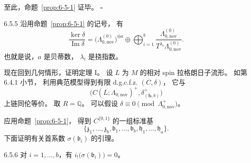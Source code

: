 至此，命题~\ref{prop:6-5-1} 证毕。
\hfill$\square$

\begin{remark}{6.5.5}\label{rem:6-5-5}
沿用命题~\ref{prop:6-5-1} 的记号，
有
\[
\frac{\ker\delta}{\operatorname{Im}\delta}
=\bigl(\Lambda_{0,\mathrm{nov}}^{(0)}\bigr)^{\oplus a}
\oplus
\bigoplus_{i=1}^{b}
\frac{\Lambda_{0,\mathrm{nov}}^{(0)}}
{T^{\lambda_i}\Lambda_{0,\mathrm{nov}}^{(0)}}.
\]
也就是说，$a$ 是贝蒂数，
$\lambda_i$ 是挠指数。
\end{remark}

现在回到几何情形，证明定理 I。
设 $L$ 为 $M$ 的相对 spin
拉格朗日子流形。
如第 6.4.1 小节，
利用典范模型得到有限 d.g.c.f.z.
$(C,\delta)$，
它与
\[
\bigl(C(L;\Lambda_{0,\mathrm{nov}})^+,
\delta^+_{(\boldsymbol b,b)}\bigr)
\]
上链同伦等价。
取 $R=\mathbb Q$。
可以假设
$\delta\equiv0
\pmod{\Lambda_{0,\mathrm{nov}}^+}$。

应用命题~\ref{prop:6-5-1}，
得到 $C^{\{0,1\}}$ 的一组标准基
\[
\{\mathfrak z_1,\ldots,\mathfrak z_b,
\mathfrak b_1,\ldots,\mathfrak b_b,
\mathfrak h_1,\ldots,\mathfrak h_a\}.
\]
\newpage
下面证明有关首系数
$\sigma(\mathfrak b_i)$ 的引理。

\begin{lemma}{6.5.6}\label{lem:6-5-6}
对 $i=1,\ldots,b$，有
$i_!\bigl(\sigma(\mathfrak b_i)\bigr)=0$。
\end{lemma}

